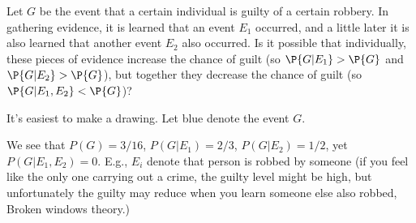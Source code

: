 

\setcounter{theorem}{13}
\begin{exercise}[BH.2.23] 
Let $G$ be the event that a certain individual is guilty of a certain robbery. In gathering evidence, it is learned that an event $E_1$ occurred, and a little later it is also learned that another event $E_2$ also occurred. Is it possible that individually, these pieces of evidence increase the chance of guilt (so $\P{G|E_1} > \P{G}$ and $\P{G|E_2} > \P{G}$), but together they decrease the chance of guilt (so $\P{G|E_1,E_2} < \P{G}$)?
	\begin{solution}
	It's easiest to make a drawing. Let blue denote the event $G$.
	\begin{center}
	\end{center}
	We see that $P(G) = 3/16$, $P(G|E_{1})=2/3$, $P(G|E_{2})=1/2$, yet $P(G|E_{1},E_{2})=0$. E.g., $E_i$ denote that person is robbed by someone (if you feel like the only one carrying out a crime, the guilty level might be high, but unfortunately the guilty may reduce when you learn someone else also robbed,  Broken windows theory.)
\end{solution}
\end{exercise}

